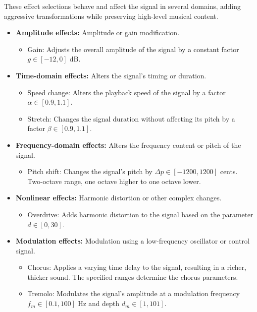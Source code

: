 These effect selections behave and affect the signal in several domains, adding aggressive transformations while preserving high-level musical content.

\begin{itemize}
\item \textbf{Amplitude effects:} Amplitude or gain modification.
\begin{itemize}
    \item Gain: Adjusts the overall amplitude of the signal by a constant factor $g \in [-12, 0]$ dB.
\end{itemize}

\item \textbf{Time-domain effects:} Alters the signal's timing or duration.
\begin{itemize}
    \item Speed change: Alters the playback speed of the signal by a factor $\alpha \in [0.9, 1.1]$.
    \item Stretch: Changes the signal duration without affecting its pitch by a factor $\beta \in [0.9, 1.1]$.
\end{itemize}

\item \textbf{Frequency-domain effects:} Alters the frequency content or pitch of the signal.
\begin{itemize}
    \item Pitch shift: Changes the signal's pitch by $\Delta p \in [-1200, 1200]$ cents. Two-octave range, one octave higher to one octave lower.
\end{itemize}

\item \textbf{Nonlinear effects:} Harmonic distortion or other complex changes.
\begin{itemize}
    \item Overdrive: Adds harmonic distortion to the signal based on the parameter $d \in [0, 30]$.
\end{itemize}

\item \textbf{Modulation effects:} Modulation using a low-frequency oscillator or control signal.
\begin{itemize}
    \item Chorus: Applies a varying time delay to the signal, resulting in a richer, thicker sound. The specified ranges determine the chorus parameters.
    \item Tremolo: Modulates the signal's amplitude at a modulation frequency $f_m \in [0.1, 100]$ Hz and depth $d_m \in [1, 101]$.
\end{itemize}


\end{itemize}
